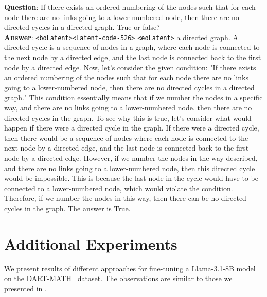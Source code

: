 \begin{minipage}{\columnwidth}
\begin{tcolorbox}[title=Example Generation of Our Latent Approach, colback=white]

\textbf{Question}:  If there exists an ordered numbering of the nodes such that for each node there are no links going to a lower-numbered node, then there are no directed cycles in a directed graph. True or false?\\

\textbf{Answer}: 
\verb|<boLatent>|\verb|<Latent-code-526>| \verb|<eoLatent>| a directed graph. A directed cycle is a sequence of nodes in a graph, where each node is connected to the next node by a directed edge, and the last node is connected back to the first node by a directed edge. Now, let's consider the given condition: "If there exists an ordered numbering of the nodes such that for each node there are no links going to a lower-numbered node, then there are no directed cycles in a directed graph." This condition essentially means that if we number the nodes in a specific way, and there are no links going to a lower-numbered node, then there are no directed cycles in the graph. To see why this is true, let's consider what would happen if there were a directed cycle in the graph. If there were a directed cycle, then there would be a sequence of nodes where each node is connected to the next node by a directed edge, and the last node is connected back to the first node by a directed edge. However, if we number the nodes in the way described, and there are no links going to a lower-numbered node, then this directed cycle would be impossible. This is because the last node in the cycle would have to be connected to a lower-numbered node, which would violate the condition. Therefore, if we number the nodes in this way, then there can be no directed cycles in the graph. The answer is True.
\end{tcolorbox}
\end{minipage}


\clearpage
\section{Additional Experiments}
\label{app:additional_experiments}
We present results of different approaches for fine-tuning a Llama-3.1-8B model on the DART-MATH~\cite{tong2024dart} dataset.
The observations are similar to those we presented in .

